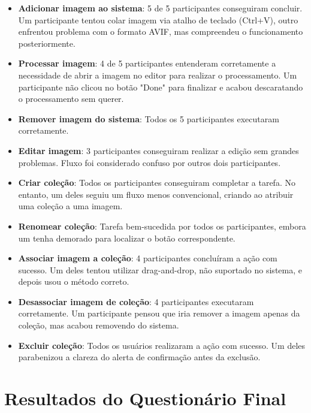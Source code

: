 \begin{itemize}
    \item \textbf{Adicionar imagem ao sistema}: 5 de 5 participantes conseguiram concluir. Um participante tentou colar imagem via atalho de teclado (Ctrl+V), outro enfrentou problema com o formato AVIF, mas compreendeu o funcionamento posteriormente.
    
    \item \textbf{Processar imagem}: 4 de 5 participantes entenderam corretamente a necessidade de abrir a imagem no editor para realizar o processamento. Um participante não clicou no botão "Done" para finalizar e acabou descaratando o processamento sem querer.

    \item \textbf{Remover imagem do sistema}: Todos os 5 participantes executaram corretamente.

    \item \textbf{Editar imagem}: 3 participantes conseguiram realizar a edição sem grandes problemas. Fluxo foi considerado confuso por outros dois participantes.

    \item \textbf{Criar coleção}: Todos os participantes conseguiram completar a tarefa. No entanto, um deles seguiu um fluxo menos convencional, criando ao atribuir uma coleção a uma imagem.

    \item \textbf{Renomear coleção}: Tarefa bem-sucedida por todos os participantes, embora um tenha demorado para localizar o botão correspondente.

    \item \textbf{Associar imagem a coleção}: 4 participantes concluíram a ação com sucesso. Um deles tentou utilizar drag-and-drop, não suportado no sistema, e depois usou o método correto.

    \item \textbf{Desassociar imagem de coleção}: 4 participantes executaram corretamente. Um participante pensou que iria remover a imagem apenas da coleção, mas acabou removendo do sistema.

    \item \textbf{Excluir coleção}: Todos os usuários realizaram a ação com sucesso. Um deles parabenizou a clareza do alerta de confirmação antes da exclusão.
\end{itemize}

\section{Resultados do Questionário Final}

